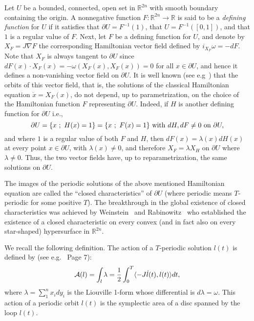 \documentclass[12pt]{article}
\begin{document}
Let $U$ be a bounded, connected, open set in ${\mathbb R}^{2n}$ with
smooth boundary containing the origin. A nonnegative function $F :
{\mathbb R}^{2n} \rightarrow {\mathbb R}$ is said to be a {\it
defining function} for $U$ if it satisfies that $\partial U =
F^{-1}(1)$, that $U = F^{-1}([0,1])$, and that $1$  is a regular
value of $F$. Next, let $F$ be a defining function for $U$, and
denote by $X_F = J \nabla F$ the corresponding Hamiltonian vector
field  defined by $i_{X_F} \omega = -dF$. Note that $X_F$ is always
tangent to $\partial U$ since $dF(x) \cdot X_F(x) = - \omega
(X_F(x),X_F(x)) =0$ for all $x \in \partial U$, and hence it defines
a non-vanishing vector field on $\partial U$. It is well known (see
e.g~\cite{HZ}) that the orbits of this vector
field, that is, %
the solutions of the classical Hamiltonian equation $\dot{x} =
X_F(x)$, do not depend, up to parametrization, on the choice of the
Hamiltonian function $F$ representing $\partial U$. Indeed, if $H$
is another defining function for $\partial U$ i.e.,
$$\partial U  = \{ x \ ; \ H(x) = 1 \} = \{x \ ; \ F(x)=1 \} \
{\rm with} \ dH,dF \neq 0 \ {\rm on} \ \partial U,$$ and where $1$
is a regular value of both $F$ and $H$,  then $dF(x) = \lambda(x)
dH(x)$ at every point $x \in
\partial U$, with $\lambda(x) \neq 0$, and therefore
 $X_F = \lambda X_H$  on $\partial U$ where $\lambda \neq 0$.
Thus, the two vector fields have, up to reparametrization, the same
solutions on ${\partial U}$.


The images of the periodic  solutions of the above mentioned
Hamiltonian equation are called the ``closed characteristics'' of
$\partial U$ (where periodic means $T$-periodic for some positive
$T$).
The breakthrough in the global existence of closed characteristics
was achieved by Weinstein~\cite{W} and Rabinowitz~\cite{R} who
established the existence of a closed characteristic on every
convex (and in fact also on every star-shaped) hypersurface in
${\mathbb R}^{2n}$.

We recall the following definition. The action of a $T$-periodic
solution $l(t)$ %
is defined by (see e.g.~\cite{HZ} Page 7):
\begin{equation}\label{action!}
{\cal A}(l) = \int_l \lambda = {\frac 1 2} \int_0^T \langle -J
\dot{l}(t) , l(t) \rangle dt,
\end{equation}
where $\lambda = \sum_1^n x_idy_i$ is the Liouville 1-form whose
differential is $d\lambda = \omega$. This action of a periodic
orbit $l(t)$ is the symplectic area of a disc spanned by the loop
$l(t)$.
\end{document}
